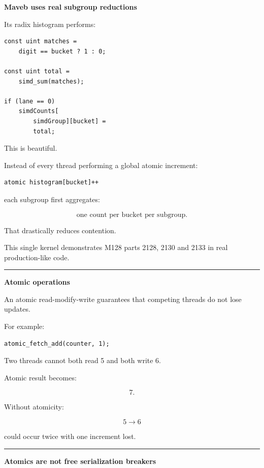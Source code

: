 \textbf{Maveb uses real subgroup reductions}

Its radix histogram performs:

\protect{}\label{z1r98r}%
\begin{verbatim}
const uint matches =
    digit == bucket ? 1 : 0;

const uint total =
    simd_sum(matches);

if (lane == 0)
    simdCounts[
        simdGroup][bucket] =
        total;
\end{verbatim}

This is beautiful.

Instead of every thread performing a global atomic increment:

\protect{}\label{nh6bpq}%
\begin{verbatim}
atomic histogram[bucket]++
\end{verbatim}

each subgroup first aggregates:

\[
\boxed{
\text{one count per bucket per subgroup}.
}
\]

That drastically reduces contention.

This single kernel demonstrates M128 parts 2128, 2130 and 2133 in real production-like code.

\begin{center}\rule{0.5\linewidth}{0.5pt}\end{center}

\textbf{Atomic operations}

An atomic read-modify-write guarantees that competing threads do not lose updates.

For example:

\protect{}\label{xpapkm}%
\begin{verbatim}
atomic_fetch_add(counter, 1);
\end{verbatim}

Two threads cannot both read 5 and both write 6.

Atomic result becomes:

\[
7.
\]

Without atomicity:

\[
5\rightarrow6
\]

could occur twice with one increment lost.

\begin{center}\rule{0.5\linewidth}{0.5pt}\end{center}

\textbf{Atomics are not free serialization breakers}


